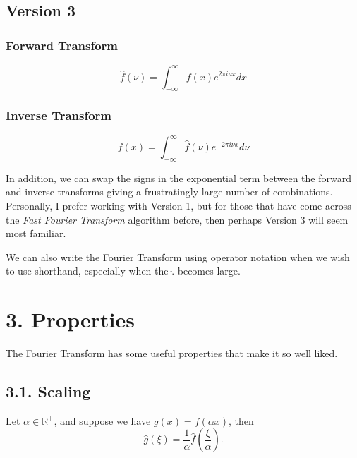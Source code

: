 \documentclass[11pt]{article}
\begin{document}
\begin{center}
    \subsection*{Version 3}
\end{center}
\begin{minipage}{0.49\textwidth}
    \begin{center}
    \subsubsection*{Forward Transform}
        \begin{equation*}
            \hat{f}(\nu) = \int_{-\infty}^{\infty} f(x) e^{2\pi i \nu x} dx
        \end{equation*}
    \end{center}
\end{minipage}
\begin{minipage}{0.49\textwidth}
    \begin{center}
    \subsubsection*{Inverse Transform}
        \begin{equation*}
            f(x) = \int_{-\infty}^{\infty} \hat{f}(\nu) e^{-2 \pi i \nu x} d\nu
        \end{equation*}
    \end{center}
\end{minipage}

In addition, we can swap the signs in the exponential term between the forward and inverse transforms giving a frustratingly large number of combinations. Personally, I prefer working with Version 1, but for those that have come across the \textit{Fast Fourier Transform} algorithm before, then perhaps Version 3 will seem most familiar.

We can also write the Fourier Transform using operator notation when we wish to use shorthand, especially when the $\hat{.}$ becomes large. 

\section*{3. Properties}
The Fourier Transform has some useful properties that make it so well liked.

\subsection*{3.1. Scaling}
Let $\alpha \in \mathbb{R}^{+}$, and suppose we have $g(x) = f(\alpha x)$, then
\begin{equation}
    \hat{g}(\xi) = \frac{1}{\alpha} \hat{f}\left(\frac{\xi}{\alpha}\right).
\end{equation}
\end{document}
